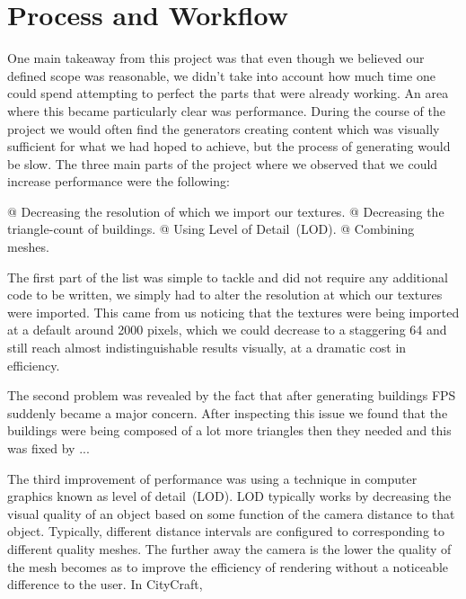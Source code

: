 \section{Process and Workflow}

One main takeaway from this project was that even though we believed our defined scope was reasonable, we didn't take into account how much time one could spend attempting to perfect the parts that were already working.
An area where this became particularly clear was performance.
During the course of the project we would often find the generators creating content which was visually sufficient for what we had hoped to achieve, but the process of generating would be slow. 
The three main parts of the project where we observed that we could increase performance were the following:

\begin{easylist}
  @ Decreasing the resolution of which we import our textures.
  @ Decreasing the triangle-count of buildings.
  @ Using Level of Detail~(LOD).
  @ Combining meshes. 
 \end{easylist}
 
The first part of the list was simple to tackle and did not require any additional code to be written, we simply had to alter the resolution at which our textures were imported.
This came from us noticing that the textures were being imported at a default around 2000 pixels, which we could decrease to a staggering 64 and still reach almost indistinguishable results visually, at a dramatic cost in efficiency. 

The second problem was revealed by the fact that after generating buildings FPS suddenly became a major concern. 
After inspecting this issue we found that the buildings were being composed of a lot more triangles then they needed and this was fixed by ...

The third improvement of performance was using a technique in computer graphics known as level of detail~(LOD).
LOD typically works by decreasing the visual quality of an object based on some function of the camera distance to that object.
Typically, different distance intervals are configured to corresponding to different quality meshes.
The further away the camera is the lower the quality of the mesh becomes as to improve the efficiency of rendering without a noticeable difference to the user.
In CityCraft, 

